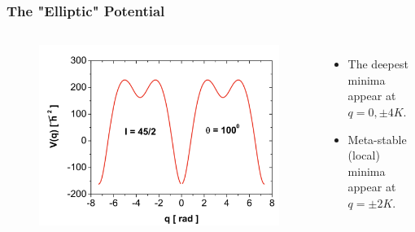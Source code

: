 \documentclass{beamer}
\begin{document}

\begin{frame}
  \frametitle{The "Elliptic" Potential}
  \begin{columns}
    \begin{figure}
      \includegraphics[scale=0.18]{figures/potential-3.png}
    \end{figure}
    \begin{itemize}
      \item The deepest minima appear at $q=0,\pm4K$.
      \item Meta-stable (local) minima appear at $q=\pm2K$.
    \end{itemize}
  \end{columns}
\end{frame}

\end{document}
